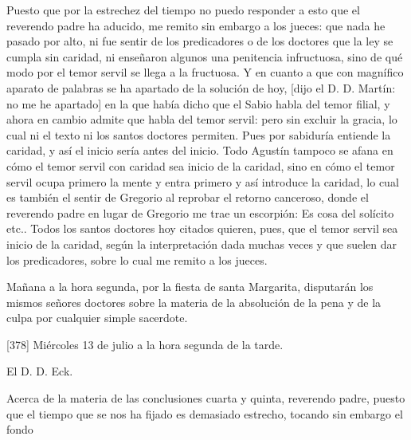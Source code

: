 Puesto que por la estrechez del tiempo no puedo responder a esto que el reverendo padre ha aducido, me remito sin embargo a los jueces: que nada he pasado por alto, ni fue sentir de los predicadores o de los doctores que la ley se cumpla sin caridad, ni enseñaron algunos una penitencia infructuosa, sino de qué modo por el temor servil se llega a la fructuosa. Y en cuanto a que con magnífico aparato de palabras se ha apartado de la solución de hoy, [dijo el D. D. Martín: no me he apartado] en la que había dicho que el Sabio habla del temor filial, y ahora en cambio admite que habla del temor servil: pero sin excluir la gracia, lo cual ni el texto ni los santos doctores permiten. Pues por sabiduría entiende la caridad, y así el inicio sería antes del inicio. Todo Agustín tampoco se afana en cómo el temor servil con caridad sea inicio de la caridad, sino en cómo el temor servil ocupa primero la mente y entra primero y así introduce la caridad, lo cual es también el sentir de Gregorio al reprobar el retorno canceroso, donde el reverendo padre en lugar de Gregorio me trae un escorpión: Es cosa del solícito etc.. Todos los santos doctores hoy citados quieren, pues, que el temor servil sea inicio de la caridad, según la interpretación dada muchas veces y que suelen dar los predicadores, sobre lo cual me remito a los jueces.

Mañana a la hora segunda, por la fiesta de santa Margarita, disputarán los mismos señores doctores sobre la materia de la absolución de la pena y de la culpa por cualquier simple sacerdote.

[378] Miércoles 13 de julio a la hora segunda de la tarde.

El D. D. Eck.

Acerca de la materia de las conclusiones cuarta y quinta, reverendo padre, puesto que el tiempo que se nos ha fijado es demasiado estrecho, tocando sin embargo el fondo

